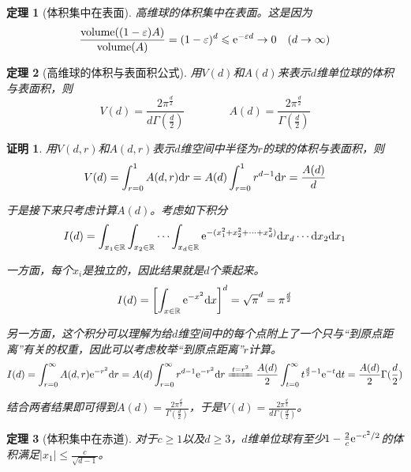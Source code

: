 \documentclass[8pt]{article}
\theoremstyle{compact}
\newtheorem{theorem}{定理}
\newtheorem{Proof}{证明}
\def\le{\leqslant}
\def\ge{\geqslant}
\begin{document}
\begin{theorem}[体积集中在表面]
	高维球的体积集中在表面。这是因为\begin{equation}
	\frac{\text{volume}((1 - \varepsilon)A)}{\text{volume}(A)} = (1 - \varepsilon)^d \le \text e^{-\varepsilon d} \to 0 \quad (d \to \infty)
	\end{equation}
	\label{surface}
\end{theorem}
\begin{theorem}[高维球的体积与表面积公式]
	用$V(d)$和$A(d)$来表示$d$维单位球的体积与表面积，则
	\begin{equation}
	V(d) = \frac{2\pi^{\frac d2}}{d\Gamma(\frac d2)} \qquad \qquad A(d) = \frac{2\pi^{\frac d2}}{\Gamma(\frac d2)}
	\end{equation}
\end{theorem}
\begin{Proof}
	用$V(d, r)$和$A(d, r)$表示$d$维空间中半径为$r$的球的体积与表面积，则
	\begin{equation}
	V(d) = \int_{r=0}^{1}A(d, r)\text dr = A(d)\int_{r=0}^{1}r^{d-1}\text dr = \frac{A(d)}{d}
	\end{equation}
	
	于是接下来只考虑计算$A(d)$。考虑如下积分
	\begin{equation}
	I(d) = \int_{x_1 \in \mathbb R} \int_{x_2 \in \mathbb R} \cdots \int_{x_d \in \mathbb R}\text{e}^{-(x_1^2 + x_2^2 + \cdots + x_d^2)}\text dx_d\cdots \text dx_2\text dx_1
	\end{equation}
	
	一方面，每个$x_i$是独立的，因此结果就是$d$个乘起来。
	\begin{equation}
	I(d) = \left[\int_{x \in \mathbb R}\text e^{-x^2}\text dx\right]^d = \sqrt{\pi}^d = \pi^{\frac d2}
	\end{equation}
	
	另一方面，这个积分可以理解为给$d$维空间中的每个点附上了一个只与“到原点距离”有关的权重，因此可以考虑枚举“到原点距离”$r$计算。
	\begin{equation}
	I(d) = \int_{r=0}^{\infty}A(d, r)\text e^{-r^2}\text dr = A(d)\int_{r=0}^{\infty}r^{d-1}\text e^{-r^2}\text dr  \xlongequal{t=r^2} \frac{A(d)}{2}\int_{t=0}^{\infty}t^{\frac{d}{2}-1}\text e^{-t}\text dt = \frac{A(d)}{2}\Gamma(\frac d2)
	\end{equation}
	
	结合两者结果即可得到$A(d) = \frac{2\pi^{\frac d2}}{\Gamma(\frac d2)}$，于是$V(d) = \frac{2\pi^{\frac d2}}{d\Gamma(\frac d2)}$。
\end{Proof}
\begin{theorem}[体积集中在赤道]
	对于$c \ge 1$以及$d \ge 3$，$d$维单位球有至少$1 - \frac{2}{c}\text e^{-c^2/2}$的体积满足$|x_1| \le \frac{c}{\sqrt{d-1}}$。
	\label{equator}
\end{theorem}
\end{document}
